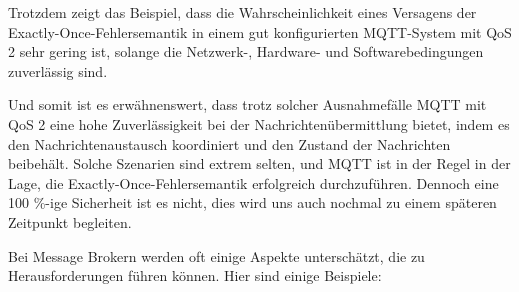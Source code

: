 Trotzdem zeigt das Beispiel, dass die Wahrscheinlichkeit eines Versagens der Exactly-Once-Fehlersemantik in einem gut konfigurierten MQTT-System mit QoS 2 sehr gering ist, solange die Netzwerk-, Hardware- und Softwarebedingungen zuverlässig sind.

Und somit ist es erwähnenswert, dass trotz solcher Ausnahmefälle MQTT mit QoS 2 eine hohe Zuverlässigkeit bei der Nachrichtenübermittlung bietet, indem es den Nachrichtenaustausch koordiniert und den Zustand der Nachrichten beibehält. Solche Szenarien sind extrem selten, und MQTT ist in der Regel in der Lage, die Exactly-Once-Fehlersemantik erfolgreich durchzuführen. Dennoch eine 100 \%-ige Sicherheit ist es nicht, dies wird uns auch nochmal zu einem späteren Zeitpunkt begleiten. 

Bei Message Brokern werden oft einige Aspekte unterschätzt, die zu Herausforderungen führen können. Hier sind einige Beispiele:

